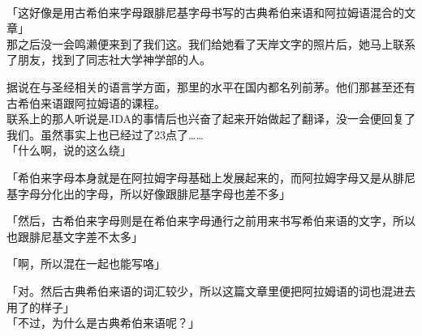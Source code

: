 \sqsplit\\

「这好像是用古希伯来字母跟腓尼基字母书写的古典希伯来语和阿拉姆语混合的文章」\\

那之后没一会鸣濑便来到了我们这。我们给她看了天岸文字的照片后，她马上联系了朋友，找到了同志社大学神学部的人。

据说在与圣经相关的语言学方面，那里的水平在国内都名列前茅。他们那甚至还有古希伯来语跟阿拉姆语的课程。\\

联系上的那人听说是JDA的事情后也兴奋了起来开始做起了翻译，没一会便回复了我们。虽然事实上也已经过了23点了……\\

「什么啊，说的这么绕」

「希伯来字母本身就是在阿拉姆字母基础上发展起来的，而阿拉姆字母又是从腓尼基字母分化出的字母，所以好像跟腓尼基字母也差不多」

「然后，古希伯来字母则是在希伯来字母通行之前用来书写希伯来语的文字，所以也跟腓尼基文字差不太多」

「啊，所以混在一起也能写咯」

「对。然后古典希伯来语的词汇较少，所以这篇文章里便把阿拉姆语的词也混进去用了的样子」\\

「不过，为什么是古典希伯来语呢？」

